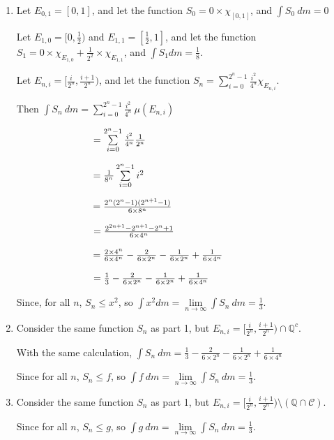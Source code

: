 \documentclass[12pt]{article}
\begin{document}
\begin{enumerate}
\item Let $E_{0,1} = [0,1]$, and let the function $S_0 = 0 \times \chi_{[0,1]}$, and $\int S_0 ~dm = 0$

      Let $E_{1,0} = [0, \frac{1}{2})$ and $E_{1,1} = [\frac{1}{2}, 1]$, and let the function $S_1 = 0 \times \chi_{E_{1,0}} + \frac{1}{2^2} \times \chi_{E_{1,1}}$, and $\int S_1 dm = \frac{1}{8}$.

      Let $E_{n,i} = [\frac{i}{2^n}, \frac{i+1}{2^n})$, and let the function $S_n = \sum\limits^{2^n-1}_{i=0} \frac{i^2}{4^n} \chi_{E_{n,i}}$.

      Then $\int S_n~dm = \sum\limits^{2^n-1}_{i=0} \frac{i^2}{4^n} ~ \mu(E_{n,i})$

      $\hspace{2.75cm}= \sum\limits^{2^n-1}_{i=0} \frac{i^2}{4^n} \frac{1}{2^n}$

      $\hspace{2.75cm}= \frac{1}{8^n} \sum\limits^{2^n-1}_{i=0} i^2$

      $\hspace{2.75cm}= \frac{2^n(2^n-1)(2^{n+1}-1)}{6\times8^n}$

      $\hspace{2.75cm}= \frac{2^{2n+1} -2^{n+1} - 2^n +1}{6\times4^n} $

      $\hspace{2.75cm}= \frac{2\times4^n}{6\times4^n} - \frac{2}{6\times2^n} - \frac{1}{6\times2^n} + \frac{1}{6\times 4^n} $

      $\hspace{2.75cm}= \frac{1}{3} - \frac{2}{6\times2^n} - \frac{1}{6\times2^n} + \frac{1}{6\times 4^n}$

      Since, for all $n$, $S_n \le x^2$, so $\int x^2dm = \lim\limits_{n \to \infty} \int S_n~dm = \frac{1}{3}$.

\item Consider the same function $S_n$ as part 1, but $E_{n,i} = [\frac{i}{2^n}, \frac{i+1}{2^n}) \cap \mathbb{Q}^c$.

        With the same calculation, $\int S_n ~dm = \frac{1}{3} - \frac{2}{6\times2^n} - \frac{1}{6\times2^n} + \frac{1}{6\times 4^n}$

        Since for all $n$, $S_n \le f$, so $\int f~dm = \lim\limits_{n \to \infty} \int S_n~dm = \frac{1}{3}$.

\item Consider the same function $S_n$ as part 1, but $E_{n,i} = [\frac{i}{2^n}, \frac{i+1}{2^n}) \setminus (\mathbb{Q}\cap\mathscr{C})$.

        Since for all $n$, $S_n \le g$, so $\int g~dm = \lim\limits_{n \to \infty} \int S_n~dm = \frac{1}{3}$.

\end{enumerate}
\end{document}
